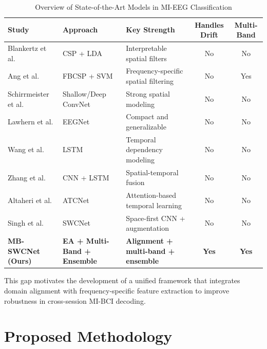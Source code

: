 \documentclass[conference]{IEEEtran}
\begin{document}
\begin{table}[t]
\caption{Overview of State-of-the-Art Models in MI-EEG Classification}
\begin{center}
\setlength{\tabcolsep}{5pt}
\begin{tabular}{|l|l|l|c|c|}
\hline
\textbf{Study} & \textbf{Approach} & \textbf{Key Strength} & \textbf{Handles Drift} & \textbf{Multi-Band} \\
\hline
Blankertz et al. \cite{b8} & CSP + LDA & Interpretable spatial filters & No & No \\
\hline
Ang et al. \cite{b9} & FBCSP + SVM & Frequency-specific spatial filtering & No & Yes \\
\hline
Schirrmeister et al. \cite{b9} & Shallow/Deep ConvNet & Strong spatial modeling & No & No \\
\hline
Lawhern et al. \cite{b10} & EEGNet & Compact and generalizable & No & No \\
\hline
Wang et al. \cite{b11} & LSTM & Temporal dependency modeling & No & No \\
\hline
Zhang et al. \cite{b12} & CNN + LSTM & Spatial-temporal fusion & No & No \\
\hline
Altaheri et al. \cite{b14} & ATCNet & Attention-based temporal learning & No & No \\
\hline
Singh et al. \cite{b1} & SWCNet & Space-first CNN + augmentation & No & No \\
\hline
\textbf{MB-SWCNet (Ours)} & \textbf{EA + Multi-Band + Ensemble} & \textbf{Alignment + multi-band + ensemble} & \textbf{Yes} & \textbf{Yes} \\
\hline
\end{tabular}
\label{tab:sota}
\end{center}
\end{table}

This gap motivates the development of a unified framework that integrates domain alignment with frequency-specific feature extraction to improve robustness in cross-session MI-BCI decoding.

\section{Proposed Methodology}
\end{document}
